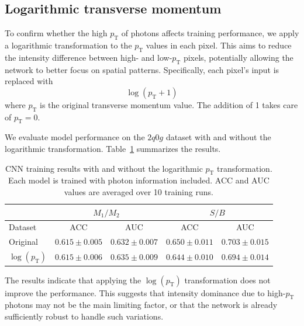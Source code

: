 \documentclass[12pt]{article}
\begin{document}
    \subsection{Logarithmic transverse momentum}%
    \label{sub:logarithmic_transverse_momentum}
        To confirm whether the high $p_{\text{T}}$ of photons affects training performance, we apply a logarithmic transformation to the $p_{\text{T}}$ values in each pixel. This aims to reduce the intensity difference between high- and low-$p_{\text{T}}$ pixels, potentially allowing the network to better focus on spatial patterns. Specifically, each pixel's input is replaced with
        \begin{equation}
            \log\left( p_{\text{T}} + 1 \right) 
        \end{equation}
        where $p_{\text{T}}$ is the original transverse momentum value. The addition of 1 takes care of $p_{\text{T}} = 0$.

        We evaluate model performance on the $2q0g$ dataset with and without the logarithmic transformation. Table~\ref{tab:CWoLa_CNN_training_results_3000_jet_tagging_log_pT} summarizes the results.
        \begin{table}[htpb]
            \centering
            \caption{CNN training results with and without the logarithmic $p_{\text{T}}$ transformation. Each model is trained with photon information included. ACC and AUC values are averaged over 10 training runs.}
            \label{tab:CWoLa_CNN_training_results_3000_jet_tagging_log_pT}
            \begin{tabular}{l|cc|cc}
                                      & \multicolumn{2}{c|}{$M_1 / M_2$}      & \multicolumn{2}{c}{$S / B$}           \\ \hline
                Dataset               & ACC               & AUC               & ACC               & AUC               \\ \hline
                Original              & $0.615 \pm 0.005$ & $0.632 \pm 0.007$ & $0.650 \pm 0.011$ & $0.703 \pm 0.015$ \\
                $\log(p_{\text{T}}) $ & $0.615 \pm 0.006$ & $0.635 \pm 0.009$ & $0.644 \pm 0.010$ & $0.694 \pm 0.014$
            \end{tabular}
        \end{table}
        The results indicate that applying the $\log(p_{\text{T}})$ transformation does not improve the performance. This suggests that intensity dominance due to high-$p_{\text{T}}$ photons may not be the main limiting factor, or that the network is already sufficiently robust to handle such variations.
\end{document}
